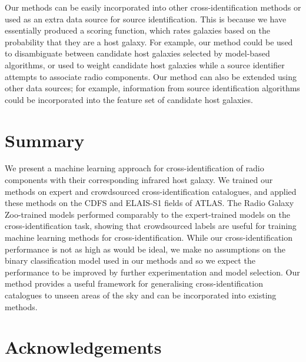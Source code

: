 \documentclass[fleqn,usenatbib,usedcolumn]{mnras}
\begin{document}
  Our methods can be easily incorporated into other cross-identification
  methods or used as an extra data source for source identification. This is
  because we have essentially produced a scoring function, which rates
  galaxies based on the probability that they are a host galaxy. For
  example, our method could be used to disambiguate between candidate host
  galaxies selected by model-based algorithms, or used to weight candidate
  host galaxies while a source identifier attempts to associate radio
  components. Our method can also be extended using other data sources; for
  example, information from source identification algorithms could be
  incorporated into the feature set of candidate host galaxies.

\section{Summary}

  We present a machine learning approach for cross-identification of radio
  components with their corresponding infrared host galaxy. We trained our
  methods on expert and crowdsourced cross-identification catalogues, and
  applied these methods on the CDFS and ELAIS-S1 fields of ATLAS. The Radio
  Galaxy Zoo-trained models performed comparably to the expert-trained models
  on the cross-identification task, showing that crowdsourced labels are
  useful for training machine learning methods for cross-identification. While
  our cross-identification performance is not as high as would be ideal, we
  make no assumptions on the binary classification model used in our methods
  and so we expect the performance to be improved by further experimentation
  and model selection. Our method provides a useful framework for generalising
  cross-identification catalogues to unseen areas of the sky and can be
  incorporated into existing methods.

\section{Acknowledgements}
  
\end{document}

